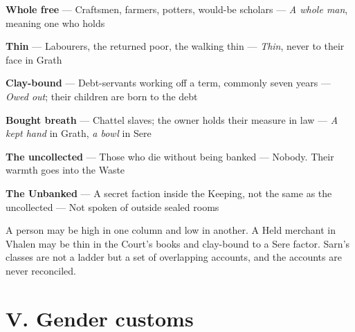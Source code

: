 \documentclass{design/chronicle}
\begin{document}
\textbf{Whole free} — Craftsmen, farmers, potters, would-be scholars — \emph{A whole man}, meaning one who holds\par

\textbf{Thin} — Labourers, the returned poor, the walking thin — \emph{Thin}, never to their face in Grath\par

\textbf{Clay-bound} — Debt-servants working off a term, commonly seven years — \emph{Owed out}; their children are born to the debt\par

\textbf{Bought breath} — Chattel slaves; the owner holds their measure in law — \emph{A kept hand} in Grath, \emph{a bowl} in Sere\par

\textbf{The uncollected} — Those who die without being banked — Nobody. Their warmth goes into the Waste\par

\textbf{The Unbanked} — A secret faction inside the Keeping, not the same as the uncollected — Not spoken of outside sealed rooms\par

A person may be high in one column and low in another. A Held merchant in Vhalen may be thin in the Court’s books and clay-bound to a Sere factor. Sarn’s classes are not a ladder but a set of overlapping accounts, and the accounts are never reconciled.

\CRrule

\section*{V. Gender customs}
\end{document}
